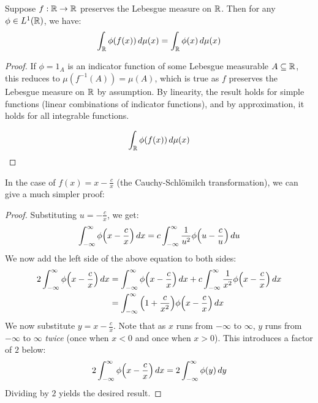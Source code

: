 \documentclass[main.tex]{subfiles}
\begin{document}
\begin{theorem}
    Suppose $f:\R\to\R$ preserves the Lebesgue measure on $\R$. Then for any $\phi\in L^1(\R)$, we have:
    \begin{equation*}
        \int_{\R} \phi(f(x))\dmu(x) = \int_{\R} \phi(x)\dmu(x)
    \end{equation*}
\end{theorem}
\begin{proof}
    If $\phi=1_A$ is an indicator function of some Lebesgue measurable $A\sub\R$, this reduces to $\mu(f^{-1}(A))=\mu(A)$, which is true as $f$ preserves the Lebesgue measure on $\R$ by assumption. By linearity, the result holds for simple functions (linear combinations of indicator functions), and by approximation, it holds for all integrable functions.

    \begin{equation*}
        \int_{\R} \phi(f(x))\dmu(x)
    \end{equation*}
\end{proof}

In the case of $f(x)=x-\frac{c}{x}$ (the Cauchy-Schlömilch transformation), we can give a much simpler proof:

\begin{proof}
    Substituting $u=-\frac{c}{x}$, we get:
    \begin{equation*}
        \int_{-\infty}^{\infty} \phi\qty(x-\frac{c}{x})\,dx
        = c\int_{-\infty}^{\infty} \frac{1}{u^2}\phi\qty(u-\frac{c}{u})\,du
    \end{equation*}
    We now add the left side of the above equation to both sides:
    \begin{align*}
        2\int_{-\infty}^{\infty} \phi\qty(x-\frac{c}{x})\,dx
        &= \int_{-\infty}^{\infty} \phi\qty(x-\frac{c}{x})\,dx
        + c\int_{-\infty}^{\infty} \frac{1}{x^2}\phi\qty(x-\frac{c}{x})\,dx \\
        &= \int_{-\infty}^{\infty} \qty(1+\frac{c}{x^2})\phi\qty(x-\frac{c}{x})\,dx
    \end{align*}
    We now substitute $y=x-\frac{c}{x}$. Note that as $x$ runs from $-\infty$ to $\infty$, $y$ runs from $-\infty$ to $\infty$ \emph{twice} (once when $x<0$ and once when $x>0$). This introduces a factor of $2$ below:
    \begin{equation*}
        2\int_{-\infty}^{\infty} \phi\qty(x-\frac{c}{x})\,dx
        = 2\int_{-\infty}^{\infty} \phi(y)\,dy
    \end{equation*}
    Dividing by $2$ yields the desired result.
\end{proof}
\end{document}
